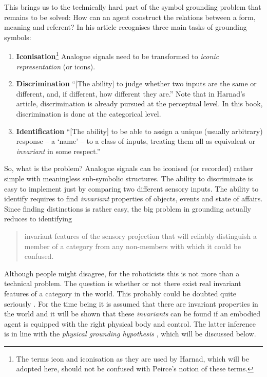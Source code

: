 

This brings us to the technically hard part of the symbol grounding problem that remains to be solved: How can an agent construct the relations between a form, meaning and referent? In his article \citet{harnad:1990} recognises three main tasks of grounding symbols:

\begin{enumerate}
\item {\bf Iconisation}\footnote{The terms icon and iconisation as they are used by Harnad, which will be adopted here, should not be confused with Peirce's notion of these terms.} Analogue signals need to be transformed to {\em iconic representation} (or icons).
\item {\bf Discrimination} ``[The ability] to judge whether two inputs are the same or different, and, if different, how different they are.'' Note that in Harnad's article, discrimination is already pursued at the perceptual level. In this book, discrimination is done at the categorical level.
\item {\bf Identification} ``[The ability] to be able to assign a unique (usually arbitrary) response -- a `name' -- to a class of inputs, treating them all as equivalent or {\em invariant} in some respect.'' \cite[my italics]{harnad:1990}
\end{enumerate}


So, what is the problem? Analogue signals can be iconised (or recorded) rather simple with meaningless sub-symbolic structures. The ability to discriminate is easy to implement just by comparing two different sensory inputs. The ability to identify requires to find {\em invariant} properties of objects, events and state of affairs. Since finding distinctions is rather easy, the big problem in grounding actually reduces to identifying

\begin{quote}
invariant features of the sensory projection that will reliably distinguish a member of  a category from any non-members with which it could be confused. \citep{harnad:1990}
\end{quote}

Although people might disagree, for the roboticists this is not more than a technical problem. The question is whether or not there exist real invariant features of a category in the world. This probably could be doubted quite seriously \citep[see, e.g., ][]{harnad:1993}. For the time being it is assumed that there are invariant properties in the world and it will be shown that these {\em invariants} can be found if an embodied agent is equipped with the right physical body and control. The latter inference is in line with the {\em physical grounding hypothesis} \citep{brooks:1990}, which will be discussed below.

